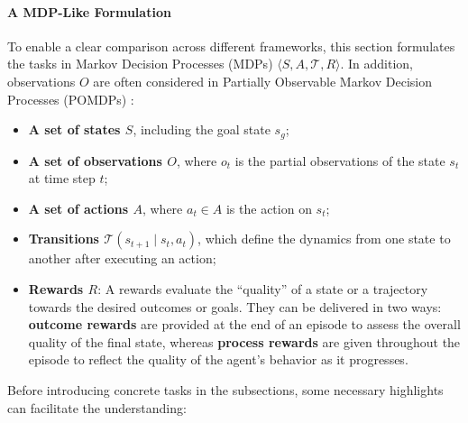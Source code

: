 \paragraph{A MDP-Like Formulation}
To enable a clear comparison across different frameworks, this section formulates the tasks in Markov Decision Processes (MDPs) $\langle S, A, \mathcal{T}, R\rangle$. In addition, observations $O$ are often considered in Partially Observable Markov Decision Processes (POMDPs) \citep{li2022pretrained,zhao2023large,hu2024treeplanner}:
\begin{itemize}
    \item \textbf{A set of states $S$}, including the goal state $s_g$;
    
    \item \textbf{A set of observations $O$}, where $o_t$ is the partial observations of the state $s_t$ at time step $t$; 
    
    \item \textbf{A set of actions $A$}, where $a_t \in A$ is the action on $s_t$;
    
    \item \textbf{Transitions $\mathcal{T}\left(s_{t+1} \mid s_t, a_t\right)$}, which define the dynamics from one state to another after executing an action;
    
    \item \textbf{Rewards $R$}: A rewards evaluate the ``quality'' of a state or a trajectory towards the desired outcomes or goals. They can be delivered in two ways: \textbf{outcome rewards} are provided at the end of an episode to assess the overall quality of the final state, whereas \textbf{process rewards} are given throughout the episode to reflect the quality of the agent’s behavior as it progresses.
\end{itemize}
Before introducing concrete tasks in the subsections, some necessary highlights can facilitate the understanding:
